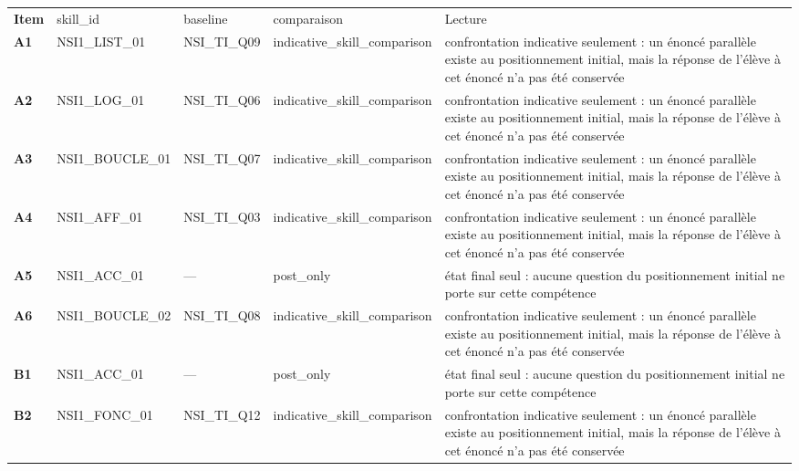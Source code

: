 \documentclass[10pt,a4paper]{article}
\begin{document}
\par\vspace{2mm}
\newpage{}
\par\noindent\begin{tabularx}{\linewidth}{>{\bfseries}p{9mm} >{\ttfamily\scriptsize}p{25mm} >{\ttfamily\scriptsize}p{22mm} >{\ttfamily\scriptsize}p{16mm} X}
\rowcolor{Navy}\color{white}Item & \color{white}\scriptsize skill\_id & \color{white}\scriptsize baseline & \color{white}\scriptsize comparaison & \color{white}Lecture \\
A1 & NSI1\_LIST\_01 & NSI\_TI\_Q09 & indicative\_skill\_comparison & confrontation indicative seulement : un énoncé parallèle existe au positionnement initial, mais la réponse de l'élève à cet énoncé n'a pas été conservée \\
A2 & NSI1\_LOG\_01 & NSI\_TI\_Q06 & indicative\_skill\_comparison & confrontation indicative seulement : un énoncé parallèle existe au positionnement initial, mais la réponse de l'élève à cet énoncé n'a pas été conservée \\
A3 & NSI1\_BOUCLE\_01 & NSI\_TI\_Q07 & indicative\_skill\_comparison & confrontation indicative seulement : un énoncé parallèle existe au positionnement initial, mais la réponse de l'élève à cet énoncé n'a pas été conservée \\
A4 & NSI1\_AFF\_01 & NSI\_TI\_Q03 & indicative\_skill\_comparison & confrontation indicative seulement : un énoncé parallèle existe au positionnement initial, mais la réponse de l'élève à cet énoncé n'a pas été conservée \\
A5 & NSI1\_ACC\_01 & --- & post\_only & état final seul : aucune question du positionnement initial ne porte sur cette compétence \\
A6 & NSI1\_BOUCLE\_02 & NSI\_TI\_Q08 & indicative\_skill\_comparison & confrontation indicative seulement : un énoncé parallèle existe au positionnement initial, mais la réponse de l'élève à cet énoncé n'a pas été conservée \\
B1 & NSI1\_ACC\_01 & --- & post\_only & état final seul : aucune question du positionnement initial ne porte sur cette compétence \\
B2 & NSI1\_FONC\_01 & NSI\_TI\_Q12 & indicative\_skill\_comparison & confrontation indicative seulement : un énoncé parallèle existe au positionnement initial, mais la réponse de l'élève à cet énoncé n'a pas été conservée \\

\end{tabularx}
\end{document}

